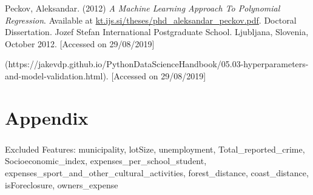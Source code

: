 \documentclass[12pt,a4paper]{article}
\begin{document}
Peckov, Aleksandar. (2012)  \textit{A Machine Learning Approach To Polynomial Regression}. Available at \href{http://kt.ijs.si/theses/phd_aleksandar_peckov.pdf}{kt.ijs.si/theses/phd\_aleksandar\_peckov.pdf}. Doctoral Dissertation. Jozef Stefan International Postgraduate School. Ljubljana, Slovenia, October 2012. [Accessed on 29/08/2019]

(https://jakevdp.github.io/PythonDataScienceHandbook/05.03-hyperparameters-and-model-validation.html). [Accessed on 29/08/2019]

\newpage
\section{Appendix}
\subsubsection{}
Excluded Features:\newline
municipality, lotSize, unemployment, Total\_reported\_crime, Socioeconomic\_index, expenses\_per\_school\_student, expenses\_sport\_and\_other\_cultural\_activities, forest\_distance, coast\_distance, isForeclosure, owners\_expense
\end{document}
